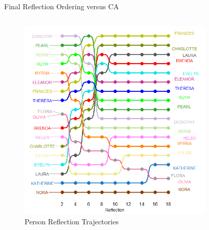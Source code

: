 \documentclass[
  ignorenonframetext,
]{beamer}
\begin{document}
\begin{frame}{Final Reflection Ordering versus CA}
\protect\hypertarget{final-reflection-ordering-versus-ca}{}
\begin{columns}[T]
\begin{column}{0.5\textwidth}
\begin{figure}

{\centering \includegraphics{Plots/p-reflections-sw.png}

}

\caption{Person Reflection Trajectories}

\end{figure}
\end{column}

\begin{column}{0.5\textwidth}
\begin{figure}


\end{figure}
\end{column}
\end{columns}
\end{frame}
\end{document}

